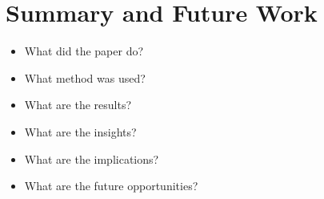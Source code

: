 \section{Summary and Future Work}

\begin{itemize}
\item What did the paper do?
\item What method was used?
\item What are the results?
\item What are the insights?
\item What are the implications?
\item What are the future opportunities?
\end{itemize}
